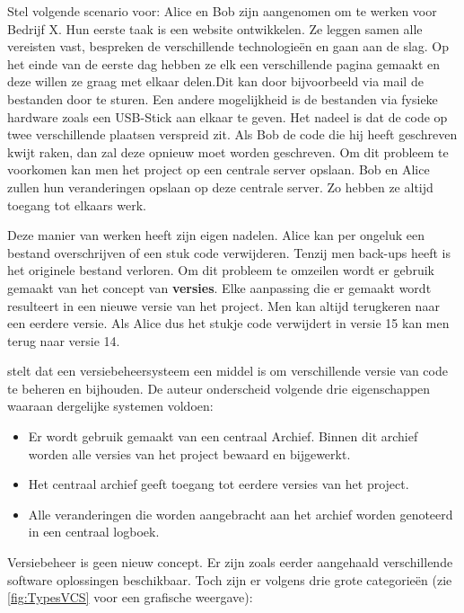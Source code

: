 Stel volgende scenario voor: Alice en Bob zijn aangenomen om te werken voor Bedrijf X. Hun eerste taak is een website ontwikkelen. Ze leggen samen alle vereisten vast, bespreken de verschillende technologieën en gaan aan de slag. Op het einde van de eerste dag hebben ze elk een verschillende pagina gemaakt en deze willen ze graag met elkaar delen.Dit kan door bijvoorbeeld via mail de bestanden door te sturen. Een andere mogelijkheid is de bestanden via fysieke hardware zoals een USB-Stick aan elkaar te geven. Het nadeel is dat de code op twee verschillende plaatsen verspreid zit. Als Bob de code die hij heeft geschreven kwijt raken, dan zal deze opnieuw moet worden geschreven. Om dit probleem te voorkomen kan men het project op een centrale server opslaan. Bob en Alice zullen hun veranderingen opslaan op deze centrale server. Zo hebben ze altijd toegang tot elkaars werk. 

Deze manier van werken heeft zijn eigen nadelen. Alice kan per ongeluk een bestand overschrijven of een stuk code verwijderen. Tenzij men back-ups heeft is het originele bestand verloren. Om dit probleem te omzeilen wordt er gebruik gemaakt van het concept van \textbf{versies}. Elke aanpassing die er gemaakt wordt resulteert in een nieuwe versie van het project. Men kan altijd terugkeren naar een eerdere versie. Als Alice dus het stukje code verwijdert in versie 15 kan men terug naar versie 14.

\textcite{Loeliger2009} stelt dat een versiebeheersysteem een middel is om verschillende versie van code te beheren en bijhouden. De auteur onderscheid volgende drie eigenschappen waaraan dergelijke systemen voldoen:

\begin{itemize}
	\item Er wordt gebruik gemaakt van een centraal Archief. Binnen dit archief worden alle versies van het project bewaard en bijgewerkt.
	\item Het centraal archief geeft toegang tot eerdere versies van het project.
	\item Alle veranderingen die worden aangebracht aan het archief worden genoteerd in een centraal logboek.
\end{itemize}

Versiebeheer is geen nieuw concept. Er zijn zoals eerder aangehaald verschillende software oplossingen beschikbaar. Toch zijn er volgens \textcite{Chacon2014} drie grote categorieën (zie \ref{fig:TypesVCS} voor een grafische weergave):

